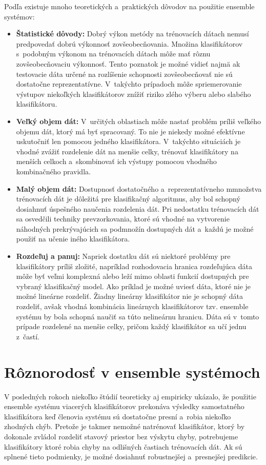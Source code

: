 Podľa \cite{polikar} existuje mnoho teoretických a~praktických dôvodov na použitie ensemble systémov:
\begin{itemize}
	\item \textbf{Štatistické dôvody:} Dobrý výkon metódy na trénovacích dátach nemusí predpovedať dobrú výkonnosť zovšeobecňovania. Množina klasifikátorov s~podobným výkonom na trénovacích dátach môže mať rôznu zovšeobecňovaciu výkonnosť. Tento poznatok je možné vidieť najmä ak testovacie dáta určené na rozlíšenie schopnosti zovšeobecňovať nie sú dostatočne reprezentatívne. V~takýchto prípadoch môže spriemerovanie výstupov niekoľkých klasifikátorov znížiť riziko zlého výberu alebo slabého klasifikátoru. 
	\item \textbf{Veľký objem dát:} V~určitých oblastiach môže nastať problém príliš veľkého objemu dát, ktorý má byť spracovaný. To nie je niekedy možné efektívne uskutočniť len pomocou jedného klasifikátora. V~takýchto situáciách je vhodné zvážiť rozdelenie dát na menšie celky, trénovať klasifikátory na menších celkoch a~skombinovať ich výstupy pomocou vhodného kombinačného pravidla.
	\item \textbf{Malý objem dát:} Dostupnosť dostatočného a~reprezentatívneho mmnožstva trénovacích dát je dôležitá pre klasifikačný algoritmus, aby bol schopný dosiahnuť úspešného naučenia rozdelenia dát. Pri nedostatku trénovacích dát sa osvedčili techniky prevzorkovania, ktoré sú vhodné na vytvorenie náhodných prekrývajúcich sa podmnožín dostupných dát a~každú je možné použiť na učenie iného klasifikátora.
	\item \textbf{Rozdeľuj a panuj:} Napriek dostatku dát sú niektoré problémy pre klasifikátory príliš zložité, napríklad rozhodovacia hranica rozdeľujúca dáta môže byť veľmi komplexná alebo leží mimo oblasti funkcií dostupných pre vybraný klasifikačný model. Ako príklad je možné uviesť dáta, ktoré nie je možné lineárne rozdeliť. Žiadny lineárny klasifikátor nie je schopný dáta rozdeliť, avšak vhodná kombinácia lineárnych klasifikátorov tzv. ensemble systému by bola schopná naučiť sa túto nelineárnu hranicu. Dáta sú v~tomto prípade rozdelené na menšie celky, pričom každý klasifikátor sa učí jednu z~častí.
\end{itemize}

\section{Rôznorodosť v ensemble systémoch}

V posledných rokoch niekoľko štúdií teoreticky \cite{teoret1} aj empiricky \cite{empiric1} ukázalo, že použitie ensemble systému viacerých klasifikátorov prekonáva výsledky samostatného klasifikátora keď členovia systému sú dostatočne presní a~robia niekoľko zhodných chýb. 
Pretože je takmer nemožné natrénovať klasifikátor, ktorý by dokonale zvládol rozdeliť stavový priestor bez výskytu chyby, potrebujeme klasifikátory ktoré robia chyby na odlišných častiach trénovacích dát. Ak sú splnené tieto podmienky, je možné dosiahnuť robustnejšej a~presnejšej predikcie. 

